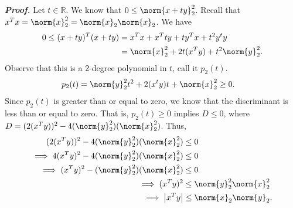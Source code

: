 \documentclass{report}
\begin{document}
\begin{itemize}
            \bigbreak \noindent 
            \textbf{\textit{Proof.}} Let $t \in \mathbb{R}$. We know that $0 \leq \norm{x + ty}_{2}^{2} $. Recall that $x^{T}x = \norm{x}_{2}^{2} = \norm{x}_{2}\norm{x}_{2}$.
            \bigbreak \noindent 
            We have
            \begin{align*}
                0 \leq (x + ty)^{T}(x+ty) &= x^{T}x + x^{T}ty + ty^{T}x + t^{2}y^{t}y \\
                                          &= \norm{x}_{2}^{2} + 2t(x^{T}y) + t^{2}\norm{y}_{2}^{2}
            .\end{align*}
            Observe that this is a 2-degree polynomial in $t$, call it $p_{2}(t)$.
            \begin{align*}
                p_{2}(t) &= \norm{y}_{2}^{2} t^{2} + 2(x^{t}y)t + \norm{x}_{2}^{2} \geq 0 
            .\end{align*}
            Since $p_{2}(t)$ is greater than or equal to zero, we know that the discriminant is less than or equal to zero. That is, $p_{2} (t) \geq 0 $ implies $D \leq 0$, where $D = (2(x^{T}y))^{2} -4(\norm{y}_{2}^{2})(\norm{x}_{2}^{2})$. Thus,
            \begin{align*}
                (2(x^{T}y))^{2} -4(\norm{y}_{2}^{2})(\norm{x}_{2}^{2}) &\leq 0 \\
                \implies 4(x^{T}y)^{2} -4(\norm{y}_{2}^{2})(\norm{x}_{2}^{2}) &\leq 0  \\
                \implies (x^{T}y)^{2} -(\norm{y}_{2}^{2})(\norm{x}_{2}^{2}) &\leq 0  \\
                \implies (x^{T}y)^{2}  &\leq \norm{y}_{2}^{2}\norm{x}_{2}^{2} \\
                \implies \left\lvert x^{T}y \right\rvert &\leq \norm{x}_{2}\norm{y}_{2}
            .\end{align*}

    \end{itemize}

    \pagebreak 
\end{document}
